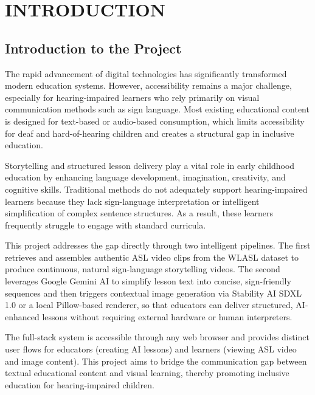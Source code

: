 \documentclass[12pt,a4paper,oneside]{report}
\begin{document}
\setcounter{page}{1}

\chapter{INTRODUCTION}

\section{Introduction to the Project}

The rapid advancement of digital technologies has significantly transformed modern education systems. However, accessibility remains a major challenge, especially for hearing-impaired learners who rely primarily on visual communication methods such as sign language. Most existing educational content is designed for text-based or audio-based consumption, which limits accessibility for deaf and hard-of-hearing children and creates a structural gap in inclusive education.

Storytelling and structured lesson delivery play a vital role in early childhood education by enhancing language development, imagination, creativity, and cognitive skills. Traditional methods do not adequately support hearing-impaired learners because they lack sign-language interpretation or intelligent simplification of complex sentence structures. As a result, these learners frequently struggle to engage with standard curricula.

This project addresses the gap directly through two intelligent pipelines. The first retrieves and assembles authentic ASL video clips from the WLASL dataset \cite{li2020wlasl} to produce continuous, natural sign-language storytelling videos. The second leverages Google Gemini AI \cite{team2023gemini} to simplify lesson text into concise, sign-friendly sequences and then triggers contextual image generation via Stability AI SDXL 1.0 \cite{podell2023sdxl} or a local Pillow-based renderer, so that educators can deliver structured, AI-enhanced lessons without requiring external hardware or human interpreters.

The full-stack system is accessible through any web browser and provides distinct user flows for educators (creating AI lessons) and learners (viewing ASL video and image content). This project aims to bridge the communication gap between textual educational content and visual learning, thereby promoting inclusive education for hearing-impaired children.
\end{document}
